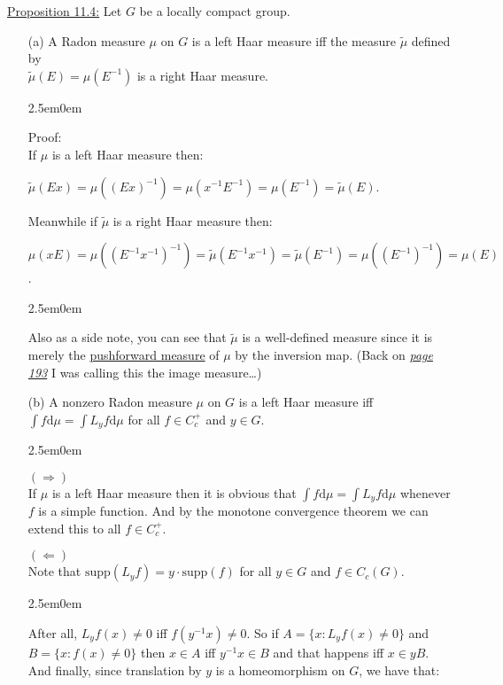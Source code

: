 \documentclass{book}
\newcommand{\inLinkRap}[2]{{\color{blue}\hyperlink{#1}{\textit{#2}}}}
\newcommand{\myComment}{%
   \color{RawerSienna}%
   \fontsize{12}{14}\selectfont%
}
\newcommand{\exTwo}{%
   \color{Purple}%
   \fontsize{13}{15}\selectfont%
}
\newcommand{\exThreeP}{%
   \color{RedViolet}%
   \fontsize{12}{14}\selectfont%
}
\newcommand{\exPPP}{%
   \color{VioletRed}%
   \fontsize{12}{14}\selectfont%
}
\newenvironment{myIndent}{%
   \begin{adjustwidth}{2.5em}{0em}%
}{%
   \end{adjustwidth}%
}
\newcommand{\udefine}[1]{{%
   \setulcolor{Red}%
   \setul{0.14em}{0.07em}%
   \ul{#1}%
}}
\newcommand{\df}{\mathrm{d}}
\newcommand{\supp}{\mathrm{supp}}
\newcommand{\retTwo}{\hfill\bigbreak}
\begin{document}
\exTwo\ul{Proposition 11.4:} Let $G$ be a locally compact group.
\begin{itemize}
	\item[(a)] A Radon measure $\mu$ on $G$ is a left Haar measure iff the measure $\widetilde{\mu}$ defined by\\ $\widetilde{\mu}(E) = \mu(E^{-1})$ is a right Haar measure.
	
	\begin{myIndent}\exThreeP
		Proof:\\
		If $\mu$ is a left Haar measure then:
		
		{\centering$\widetilde{\mu}(Ex) = \mu((Ex)^{-1}) = \mu(x^{-1} E^{-1}) = \mu(E^{-1}) = \widetilde{\mu}(E)$.\retTwo\par} 

		Meanwhile if $\widetilde{\mu}$ is a right Haar measure then:

		{\centering$\mu(xE) = \mu((E^{-1}x^{-1})^{-1}) = \widetilde{\mu}(E^{-1}x^{-1}) = \widetilde{\mu}(E^{-1}) = \mu((E^{-1})^{-1}) = \mu(E)$.\retTwo\par}
		
		\begin{myIndent}\myComment
			Also as a side note, you can see that $\widetilde{\mu}$ is a well-defined measure since it is merely the \udefine{pushforward measure} of $\mu$ by the inversion map. (Back on \inLinkRap{Folland Proposition 10.1}{page 193} I was calling this the image measure\dots)\retTwo
		\end{myIndent}
	\end{myIndent}

	\item[(b)] A nonzero Radon measure $\mu$ on $G$ is a left Haar measure iff $\int f \df \mu = \int L_y f \df \mu$ for all $f \in C_c^+$ and $y \in G$.
	
	\begin{myIndent}\exThreeP
		$(\Longrightarrow)$\\
		If $\mu$ is a left Haar measure then it is obvious that $\int f \df \mu = \int L_y f \df \mu$ whenever $f$ is a simple function. And by the monotone convergence theorem we can extend this to all $f \in C_c^+$.\retTwo

		$(\Longleftarrow)$\\
		Note that $\supp(L_yf) = y \cdot \supp(f)$ for all $y \in G$ and $f \in C_c(G)$.
		\begin{myIndent}\exPPP
			After all, $L_yf(x) \neq 0$ iff $f(y^{-1}x) \neq 0$. So if $A = \{x : L_yf(x) \neq 0\}$ and $B = \{x : f(x) \neq 0\}$ then $x \in A$ iff $y^{-1}x \in B$ and that happens iff $x \in yB$. And finally, since translation by $y$ is a homeomorphism on $G$, we have that:
		

\end{myIndent}
\end{myIndent}
\end{itemize}
\end{document}
